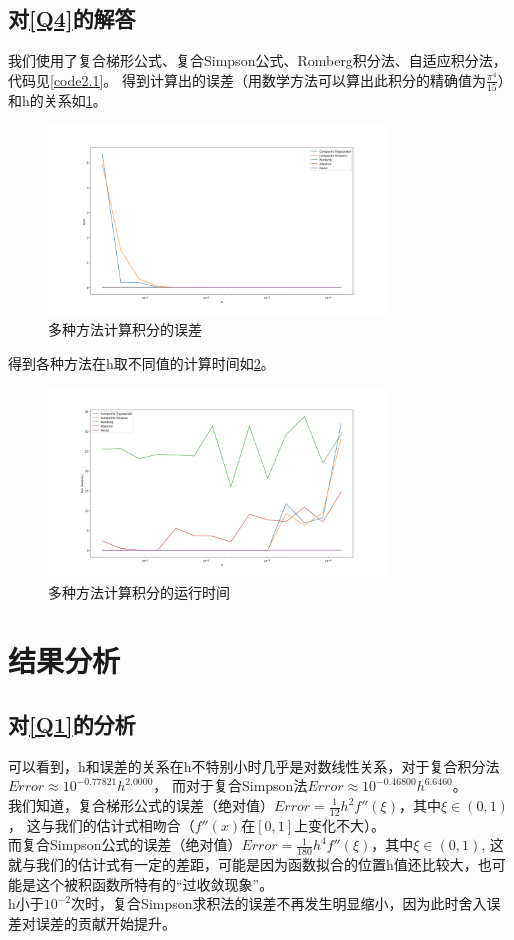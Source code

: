 \documentclass[a4paper,11pt,notitlepage]{article}
\begin{document}
\subsection{对\ref{Q4}的解答}
我们使用了复合梯形公式、复合Simpson公式、Romberg积分法、自适应积分法，代码见\cref{code2.1}。
得到计算出的误差（用数学方法可以算出此积分的精确值为$\frac{\pi^4}{15}$）和h的关系如\cref{pic:4}。
\begin{figure}[H]
    \centering
    \includegraphics[width=0.8\textwidth]{../picture/Fifth_Chapter_2.png}
    \caption{多种方法计算积分的误差}
    \label{pic:4}
\end{figure}
得到各种方法在h取不同值的计算时间如\cref{pic:5}。
\begin{figure}[H]
    \centering
    \includegraphics[width=0.8\textwidth]{../picture/Fifth_Chapter_2(1).png}
    \caption{多种方法计算积分的运行时间}
    \label{pic:5}
\end{figure}

\section{结果分析}
\subsection{对\ref{Q1}的分析}
可以看到，h和误差的关系在h不特别小时几乎是对数线性关系，对于复合积分法$Error\approx 10^{-0.77821}h^{2.0000}$，
而对于复合Simpson法$Error\approx 10^{-0.46800}h^{6.6460}$。\\
\indent 我们知道，复合梯形公式的误差（绝对值）$Error=\frac{1}{12}h^2f''(\xi )$，其中$\xi \in (0,1)$，
这与我们的估计式相吻合（$f''(x)$在$[0,1]$上变化不大）。\\
\indent 而复合Simpson公式的误差（绝对值）$Error=\frac{1}{180}h^4f''(\xi )$，其中$\xi \in (0,1)$,
这就与我们的估计式有一定的差距，可能是因为函数拟合的位置h值还比较大，也可能是这个被积函数所特有的“过收敛现象”。\\
\indent h小于$10^{-2}$次时，复合Simpson求积法的误差不再发生明显缩小，因为此时舍入误差对误差的贡献开始提升。
\end{document}

